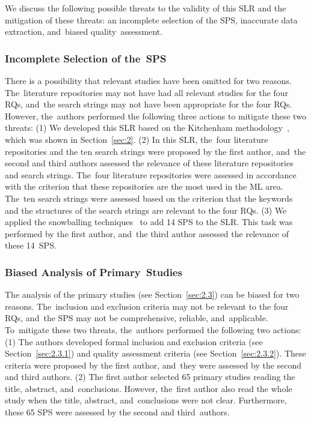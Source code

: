 \documentclass[sensors,review,accept,moreauthors,pdftex]{Definitions/mdpi}
\begin{document}
We discuss the following possible threats to the validity of this SLR and the mitigation of these threats: an incomplete selection of the SPS, inaccurate data extraction, and~biased quality~assessment.

\subsubsection{Incomplete Selection of the~SPS}

There is a possibility that relevant studies have been omitted for two reasons. The~literature repositories may not have had all relevant studies for the four RQs, and~the search strings may not have been appropriate for the four RQs. However, the~authors performed the following three actions to mitigate these two threats: (1) We developed this SLR based on the Kitchenham methodology~\cite{kitchenham2004procedures,kitchenham2009systematic}, which was shown in Section~\ref{sec:2}. (2) In this SLR, the~four literature repositories and the ten search strings were proposed by the first author, and~the second and third authors assessed the relevance of these literature repositories and search strings. The~four literature repositories were assessed in accordance with the criterion that these repositories are the most used in the ML area. The~ten search strings were assessed based on the criterion that the keywords and the structures of the search strings are relevant to the four RQs. (3) We applied the snowballing techniques~\cite{wohlin2014guidelines} to add 14 SPS to the SLR. This task was performed by the first author, and~the third author assessed the relevance of these 14~SPS.  


\subsubsection{Biased Analysis of Primary~Studies}

The analysis of the primary studies (see Section~\ref{sec:2.3}) can be biased for two reasons. The~inclusion and exclusion criteria may not be relevant to the four RQs, and~the SPS may not be comprehensive, reliable, and~applicable. To~mitigate these two threats, the~authors performed the following two actions: (1) The authors developed formal inclusion and exclusion criteria (see Section~\ref{sec:2.3.1}) and quality assessment criteria (see Section~\ref{sec:2.3.2}). These criteria were proposed by the first author, and~they were assessed by the second and third authors. (2) The first author selected 65 primary studies reading the title, abstract, and~conclusions. However, the~first author also read the whole study when the title, abstract, and~conclusions were not clear. Furthermore, these 65 SPS were assessed by the second and third~authors.
\end{document}
